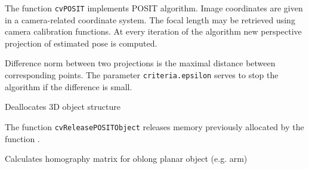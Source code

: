 \begin{description}
\end{description}

The function \texttt{cvPOSIT} implements POSIT algorithm. Image coordinates are given in a camera-related coordinate system. The focal length may be retrieved using camera calibration functions. At every iteration of the algorithm new perspective projection of estimated pose is computed.

Difference norm between two projections is the maximal distance between corresponding points. The parameter \texttt{criteria.epsilon} serves to stop the algorithm if the difference is small.

\label{ReleasePOSITObject}

Deallocates 3D object structure


\begin{description}
\end{description}

The function \texttt{cvReleasePOSITObject} releases memory previously allocated by the function .


\label{CalcImageHomography}

Calculates homography matrix for oblong planar object (e.g. arm)


\begin{description}
\end{description}

